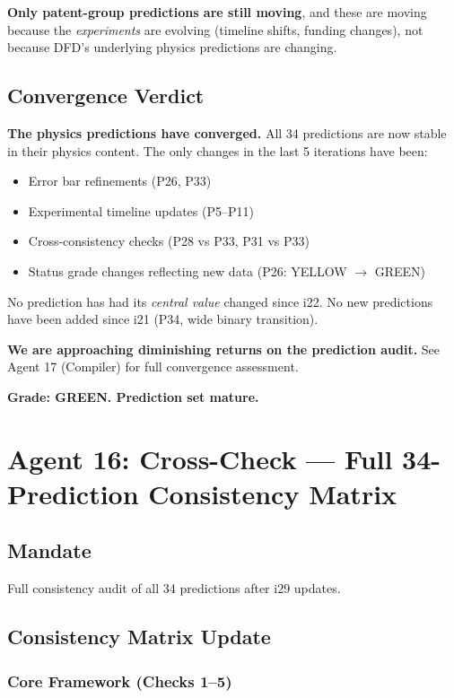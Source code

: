 \documentclass[11pt,a4paper]{article}
\begin{document}
\textbf{Only patent-group predictions are still moving}, and these are moving because the \emph{experiments} are evolving (timeline shifts, funding changes), not because DFD's underlying physics predictions are changing.

\subsection{Convergence Verdict}

\textbf{The physics predictions have converged.} All 34 predictions are now stable in their physics content. The only changes in the last 5 iterations have been:
\begin{itemize}
\item Error bar refinements (P26, P33)
\item Experimental timeline updates (P5--P11)
\item Cross-consistency checks (P28 vs P33, P31 vs P33)
\item Status grade changes reflecting new data (P26: YELLOW $\to$ GREEN)
\end{itemize}

No prediction has had its \emph{central value} changed since i22. No new predictions have been added since i21 (P34, wide binary transition).

\textbf{We are approaching diminishing returns on the prediction audit.} See Agent 17 (Compiler) for full convergence assessment.

\textbf{Grade: GREEN. Prediction set mature.}

\section{Agent 16: Cross-Check --- Full 34-Prediction Consistency Matrix}

\subsection{Mandate}
Full consistency audit of all 34 predictions after i29 updates.

\subsection{Consistency Matrix Update}

\subsubsection{Core Framework (Checks 1--5)}
\end{document}
